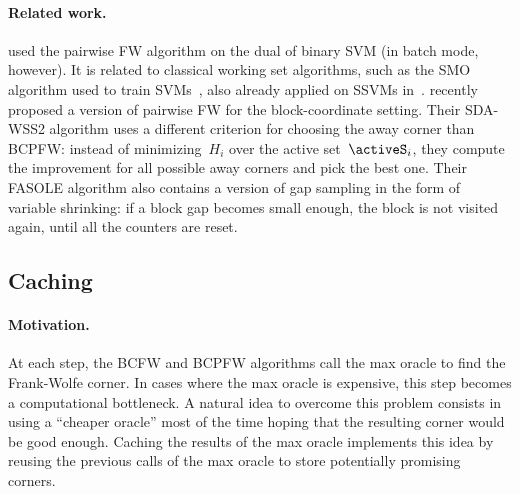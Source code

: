 \documentclass{article}
\begin{document}
\paragraph{Related work.}
\citet[Alg.~4]{nanculef2014} used the pairwise FW algorithm on the dual of binary SVM (in batch mode, however). It is related to classical working set algorithms, such as the SMO algorithm used to train SVMs~\cite{platt1999SMO}, also already applied on SSVMs in~\citet[Ch.~6]{taskar04thesis}.
\citet{franc2014fasole} recently proposed a version of pairwise FW for the block-coordinate setting.
Their SDA-WSS2 algorithm uses a different criterion for choosing the away corner than BCPFW:
instead of minimizing~$H_i$ over the active set~$\activeS_i$, they compute the improvement for all possible away corners and pick the best one.
Their FASOLE algorithm also contains a version of gap sampling in the form of variable shrinking: if a block gap becomes small enough, the block is not visited again, until all the counters are reset.

%
%
%
%
%
%

%
%
%
%
%
%
%
%
%

%
%
%
%
%
%
%

%

%

%
%
%
%
%
%


\subsection{Caching \label{sec:caching}}

\paragraph{Motivation.}
At each step, the BCFW and BCPFW algorithms call the max oracle to find the Frank-Wolfe corner.
In cases where the max oracle is expensive, this step becomes a computational bottleneck.
A natural idea to overcome this problem consists in using a ``cheaper oracle'' most of the time hoping that the resulting corner would be good enough.
Caching the results of the max oracle implements this idea by reusing the previous calls of the max oracle to store potentially promising corners.

%
%
%
%
%
%
%
\end{document}
